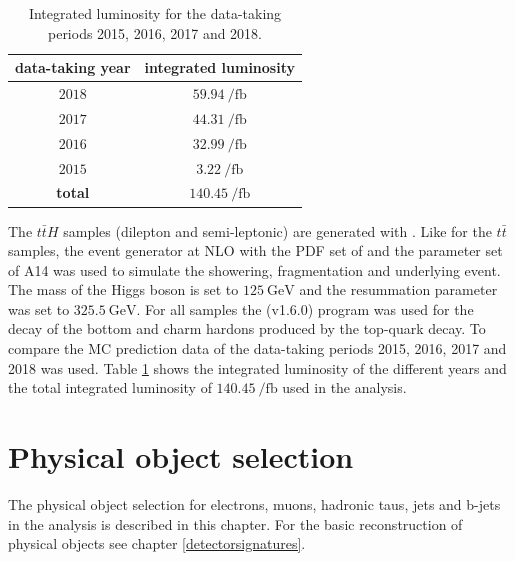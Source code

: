 %
\begin{table}[htbp]
		\centering
                \renewcommand{\arraystretch}{1.2}       
		\begin{tabular*}{\linewidth}{@{\extracolsep{\fill}}cc}
		\hline
		\hline
		\textbf{data-taking year}&  \textbf{integrated luminosity}
		\\
		\hline
                $2018$                & $\SI{59.94}{\per\femto\barn}$
                \\
                $2017$                & $\SI{44.31}{\per\femto\barn}$
                \\
                $2016$                & $\SI{32.99}{\per\femto\barn}$
                \\
                $2015$                & $\SI{3.22}{\per\femto\barn}$
                \\
                \hline
                \textbf{total}        & $\SI{140.45}{\per\femto\barn}$
                \\
		\hline
		\hline
		\end{tabular*}
		\caption[Integrated luminosity for the data-taking periods 2015-2018.]{Integrated luminosity for the data-taking periods 2015, 2016, 2017 and 2018.}
\label{datalumi}
\renewcommand{\arraystretch}{1}
\end{table}
%
The $t\bar{t}H$ samples (dilepton and semi-leptonic) are generated with {\POWHEG}. Like for the $t\bar{t}$ samples, the event generator {\Pythia} at NLO with the PDF set of {\NNPDFz} and the parameter set of A14 was used to simulate the showering, fragmentation and underlying event. The mass of the Higgs boson is set to $\SI{125}{\giga\electronvolt}$ and the resummation parameter was set to $\SI{325.5}{\giga\electronvolt}$. \newline
For all samples the {\EvtGen} (v1.6.0) \cite{EvtGen} program was used for the decay of the bottom and charm hardons produced by the top-quark decay.\newline
To compare the MC prediction data of the data-taking periods 2015, 2016, 2017 and 2018 was used. Table \ref{datalumi} shows the integrated luminosity of the different years and the total integrated luminosity of $\SI{140.45}{\per\femto\barn}$ used in the analysis.
\section{Physical object selection}\label{physObj}
The physical object selection for electrons, muons, hadronic taus, jets and b-jets in the analysis is described in this chapter. For the basic reconstruction of physical objects see chapter \ref{detectorsignatures}.
